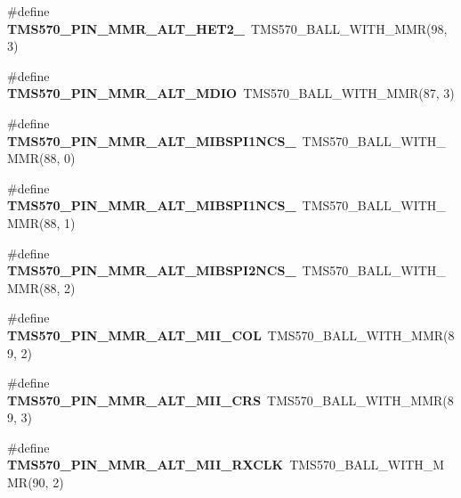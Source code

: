 \begin{DoxyCompactItemize}
\#define {\bfseries T\+M\+S570\+\_\+\+P\+I\+N\+\_\+\+M\+M\+R\+\_\+\+A\+L\+T\+\_\+\+H\+E\+T2\+\_}~T\+M\+S570\+\_\+\+B\+A\+L\+L\+\_\+\+W\+I\+T\+H\+\_\+\+M\+MR(98, 3)
\item 
\mbox{\label{tms570lc4357-pins_8h_ad7efdb677afa07c5a8ac54e0e9286542}} 
\#define {\bfseries T\+M\+S570\+\_\+\+P\+I\+N\+\_\+\+M\+M\+R\+\_\+\+A\+L\+T\+\_\+\+M\+D\+IO}~T\+M\+S570\+\_\+\+B\+A\+L\+L\+\_\+\+W\+I\+T\+H\+\_\+\+M\+MR(87, 3)
\item 
\mbox{\label{tms570lc4357-pins_8h_ab4df84e2c3042c4ab9c1cf50c3d5d5c2}} 
\#define {\bfseries T\+M\+S570\+\_\+\+P\+I\+N\+\_\+\+M\+M\+R\+\_\+\+A\+L\+T\+\_\+\+M\+I\+B\+S\+P\+I1\+N\+C\+S\+\_}~T\+M\+S570\+\_\+\+B\+A\+L\+L\+\_\+\+W\+I\+T\+H\+\_\+\+M\+MR(88, 0)
\item 
\mbox{\label{tms570lc4357-pins_8h_aac2aac536a9a757006ea5d9641bac886}} 
\#define {\bfseries T\+M\+S570\+\_\+\+P\+I\+N\+\_\+\+M\+M\+R\+\_\+\+A\+L\+T\+\_\+\+M\+I\+B\+S\+P\+I1\+N\+C\+S\+\_}~T\+M\+S570\+\_\+\+B\+A\+L\+L\+\_\+\+W\+I\+T\+H\+\_\+\+M\+MR(88, 1)
\item 
\mbox{\label{tms570lc4357-pins_8h_aeccc11261d183a790d30544672ed5bc1}} 
\#define {\bfseries T\+M\+S570\+\_\+\+P\+I\+N\+\_\+\+M\+M\+R\+\_\+\+A\+L\+T\+\_\+\+M\+I\+B\+S\+P\+I2\+N\+C\+S\+\_}~T\+M\+S570\+\_\+\+B\+A\+L\+L\+\_\+\+W\+I\+T\+H\+\_\+\+M\+MR(88, 2)
\item 
\mbox{\label{tms570lc4357-pins_8h_af059d469b5a7d7a7f9fe9ab3e8ba2635}} 
\#define {\bfseries T\+M\+S570\+\_\+\+P\+I\+N\+\_\+\+M\+M\+R\+\_\+\+A\+L\+T\+\_\+\+M\+I\+I\+\_\+\+C\+OL}~T\+M\+S570\+\_\+\+B\+A\+L\+L\+\_\+\+W\+I\+T\+H\+\_\+\+M\+MR(89, 2)
\item 
\mbox{\label{tms570lc4357-pins_8h_a3d818e61249e31d52758af2113d532fe}} 
\#define {\bfseries T\+M\+S570\+\_\+\+P\+I\+N\+\_\+\+M\+M\+R\+\_\+\+A\+L\+T\+\_\+\+M\+I\+I\+\_\+\+C\+RS}~T\+M\+S570\+\_\+\+B\+A\+L\+L\+\_\+\+W\+I\+T\+H\+\_\+\+M\+MR(89, 3)
\item 
\mbox{\label{tms570lc4357-pins_8h_a7dc0fb99af8223c2827337df53123f2a}} 
\#define {\bfseries T\+M\+S570\+\_\+\+P\+I\+N\+\_\+\+M\+M\+R\+\_\+\+A\+L\+T\+\_\+\+M\+I\+I\+\_\+\+R\+X\+C\+LK}~T\+M\+S570\+\_\+\+B\+A\+L\+L\+\_\+\+W\+I\+T\+H\+\_\+\+M\+MR(90, 2)

\end{DoxyCompactItemize}
